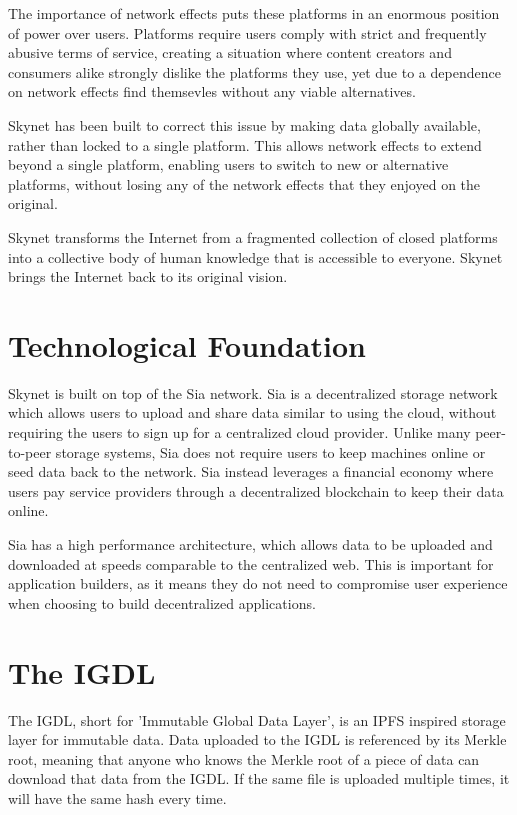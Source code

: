 \documentclass[twocolumn]{article}
\begin{document}
The importance of network effects puts these platforms in an enormous position
of power over users. Platforms require users comply with strict and frequently
abusive terms of service, creating a situation where content creators and
consumers alike strongly dislike the platforms they use, yet due to a dependence
on network effects find themsevles without any viable alternatives.

Skynet has been built to correct this issue by making data globally available,
rather than locked to a single platform. This allows network effects to extend
beyond a single platform, enabling users to switch to new or alternative
platforms, without losing any of the network effects that they enjoyed on the
original.

Skynet transforms the Internet from a fragmented collection of closed platforms
into a collective body of human knowledge that is accessible to everyone. Skynet
brings the Internet back to its original vision.

\section{Technological Foundation}
Skynet is built on top of the Sia \cite{sia} network. Sia is a decentralized
storage network which allows users to upload and share data similar to using the
cloud, without requiring the users to sign up for a centralized cloud provider.
Unlike many peer-to-peer storage systems, Sia does not require users to keep
machines online or seed data back to the network. Sia instead leverages a
financial economy where users pay service providers through a decentralized
blockchain to keep their data online.

Sia has a high performance architecture, which allows data to be uploaded and
downloaded at speeds comparable to the centralized web. This is important for
application builders, as it means they do not need to compromise user experience
when choosing to build decentralized applications.

\section{The IGDL}
The IGDL, short for 'Immutable Global Data Layer', is an IPFS \cite{ipfs}
inspired storage layer for immutable data. Data uploaded to the IGDL is
referenced by its Merkle root, meaning that anyone who knows the Merkle root of
a piece of data can download that data from the IGDL. If the same file is
uploaded multiple times, it will have the same hash every time.
\end{document}
